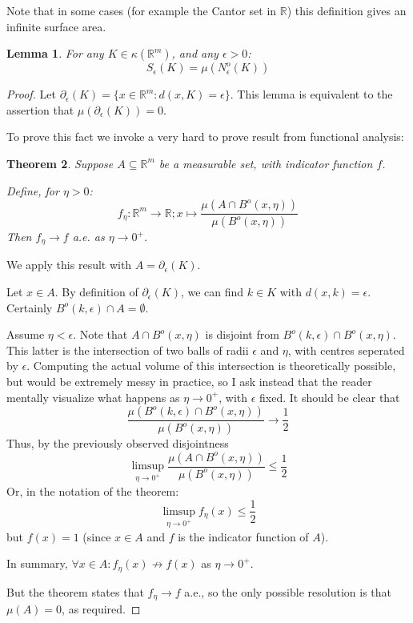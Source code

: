 \documentclass[a4paper,11pt]{article}
\newcommand{\bbR}{\mathbb{R}}
\newtheorem{thm}{Theorem}[section]
\newtheorem{lemma}[thm]{Lemma}
\begin{document}
Note that in some cases (for example the Cantor set in $\bbR$) this definition
gives an infinite surface area.

\begin{lemma}
\label{thm:openNeighbourhoods}
For any $K\in\kappa(\bbR^m)$, and any $\epsilon>0$:
\[
S_\epsilon(K)=\mu(N_\epsilon^o(K))
\]
\end{lemma}

\begin{proof}
Let $\partial_\epsilon(K)=\{x\in\bbR^m:d(x,K)=\epsilon\}$.  This lemma is
equivalent to the assertion that $\mu(\partial_\epsilon(K))=0$.

To prove this fact we invoke a very hard to prove result from functional
analysis:

\begin{thm}
Suppose $A\subseteq\bbR^m$ be a measurable set, with indicator function $f$.

Define, for $\eta>0$:
\[
f_\eta:\bbR^m\to\bbR;x\mapsto\frac{\mu(A\cap B^o(x,\eta))}{\mu(B^o(x,\eta))}
\]
Then $f_\eta\to f$ a.e. as $\eta\to0^+$.
\end{thm}

We apply this result with $A=\partial_\epsilon(K)$.

Let $x\in A$.  By definition of $\partial_\epsilon(K)$, we can find $k\in K$
with $d(x,k)=\epsilon$.  Certainly $B^o(k,\epsilon)\cap A=\emptyset$.

Assume $\eta<\epsilon$.  Note that $A\cap B^o(x,\eta)$ is disjoint from
$B^o(k,\epsilon)\cap B^o(x,\eta)$.  This latter is the intersection of two
balls of radii $\epsilon$ and $\eta$, with centres seperated by $\epsilon$.
Computing the actual volume of this intersection is theoretically possible, but
would be extremely messy in practice, so I ask instead that the reader
mentally visualize what happens as $\eta\to0^+$, with $\epsilon$ fixed.
It should be clear that
\[
\frac{\mu(B^o(k,\epsilon)\cap B^o(x,\eta))}{\mu(B^o(x,\eta))}\to\frac{1}{2}
\]
Thus, by the previously observed disjointness
\[
\limsup_{\eta\to0^+}\frac{\mu(A\cap B^o(x,\eta))}{\mu(B^o(x,\eta))}
  \leq\frac{1}{2}
\]
Or, in the notation of the theorem:
\[
\limsup_{\eta\to0^+}f_\eta(x)\leq\frac{1}{2}
\]
but $f(x)=1$ (since $x\in A$ and $f$ is the indicator function of $A$).

In summary, $\forall x\in A:f_\eta(x)\not\to f(x)$ as $\eta\to0^+$.

But the theorem states that $f_\eta\to f$ a.e., so the only possible resolution
is that $\mu(A)=0$, as required.
\end{proof}
\end{document}
